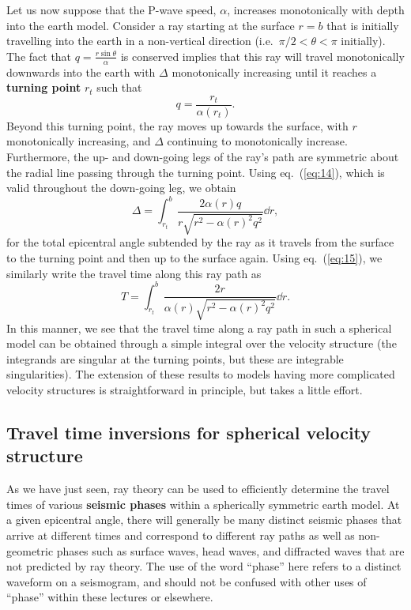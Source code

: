 Let us now suppose that the P-wave speed, $\alpha$, increases monotonically with depth into the earth model. Consider a ray starting at the surface $r=b$ that is initially 
travelling into the earth in a non-vertical direction (i.e.\ $\pi/2<\theta<\pi$ initially). The fact that $q=\frac{r \sin \theta}{\alpha}$ is conserved implies that this 
ray will travel monotonically downwards into the earth with $\Delta$ monotonically increasing until it reaches a \textbf{turning point} $r_{t}$ such that
\begin{equation}
q=\frac{r_{t}}{\alpha(r_{t})}.
\label{eq:16}
\end{equation}
Beyond this turning point, the ray moves up towards the surface, with $r$ monotonically increasing, and $\Delta$ continuing to monotonically increase. Furthermore, the up- and down-going 
legs of the ray's path are symmetric about the radial line passing through the turning point. Using eq.~(\ref{eq:14}), which is valid throughout the down-going leg, we obtain
\begin{equation}
\Delta=\int_{r_{t}}^{b}\frac{2\alpha(r)q}{r\sqrt{r^{2}-\alpha(r)^{2}q^{2}}}\dd r,
\label{eq:17}
\end{equation}
for the total epicentral angle subtended by the ray as it travels from the surface to the turning point and then up to the surface again. Using eq.~(\ref{eq:15}), we similarly write the travel time along this ray path as
\begin{equation}
T=\int_{r_{t}}^{b}\frac{2r}{\alpha(r)\sqrt{r^{2}-\alpha(r)^{2}q^{2}}}\dd r.
\label{eq:18}
\end{equation}
In this manner, we see that the travel time along a ray path in such a spherical model can be obtained through a simple integral over the velocity structure (the integrands are 
singular at the turning points, but these are integrable singularities). The extension of these results to models having more complicated velocity structures is 
straightforward in principle, but takes a little effort.

\subsection*{Travel time inversions for spherical velocity structure}
As we have just seen, ray theory can be used to efficiently determine the travel times of various \textbf{seismic phases} 
within a spherically symmetric earth model. At a given epicentral 
angle, there will generally be many distinct seismic phases that arrive at different times and correspond to different ray 
paths as well as non-geometric phases such as surface 
waves, head waves, and diffracted waves that are not predicted by ray theory. The use of the word ``phase'' here refers to a distinct 
waveform on a seismogram, and should not 
be confused with other uses of ``phase'' within these lectures or elsewhere.

